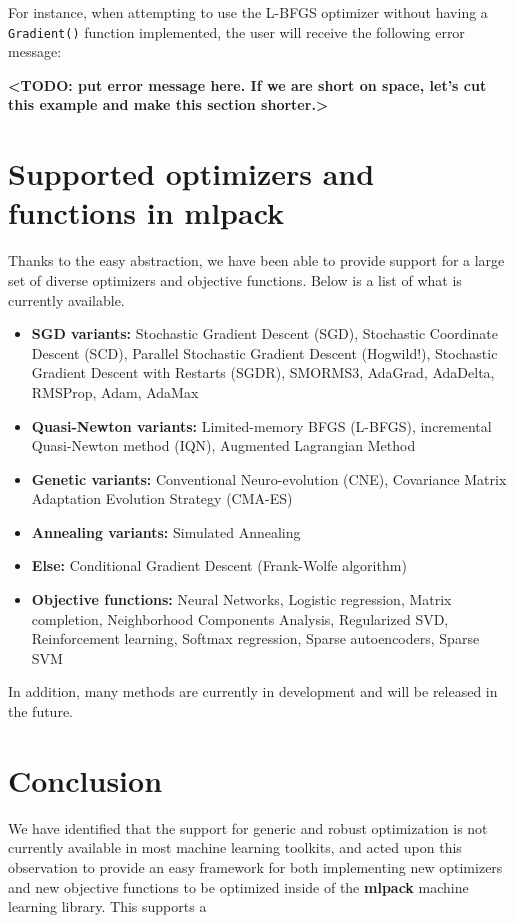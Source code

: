 \documentclass{article}
\begin{document}
For instance, when attempting to use the L-BFGS optimizer without having a
{\tt Gradient()} function implemented, the user will receive the following error
message:

{\bf <TODO: put error message here.  If we are short on space, let's cut this
example and make this section shorter.>}

\section{Supported optimizers and functions in mlpack}

Thanks to the easy abstraction, we have been able to provide support for a large
set of diverse optimizers and objective functions.  Below is a list of what is
currently available.

\begin{itemize}
  \item {\bf SGD variants:} Stochastic Gradient Descent (SGD), Stochastic
      Coordinate Descent (SCD), Parallel Stochastic Gradient Descent (Hogwild!),
      Stochastic Gradient Descent with Restarts (SGDR), SMORMS3, AdaGrad,
      AdaDelta, RMSProp, Adam, AdaMax

  \item {\bf Quasi-Newton variants:} Limited-memory BFGS (L-BFGS), incremental
        Quasi-Newton method (IQN), Augmented Lagrangian Method

  \item {\bf Genetic variants:} Conventional Neuro-evolution (CNE), Covariance
        Matrix Adaptation Evolution Strategy (CMA-ES)

  \item {\bf Annealing variants:} Simulated Annealing

  \item {\bf Else:} Conditional Gradient Descent (Frank-Wolfe algorithm)

  \item {\bf Objective functions:} Neural Networks, Logistic regression,
      Matrix completion, Neighborhood Components Analysis, Regularized SVD,
      Reinforcement learning, Softmax regression, Sparse autoencoders,
      Sparse SVM
\end{itemize}

In addition, many methods are currently in development and will be released in
the future.

\section{Conclusion}

We have identified that the support for generic and robust optimization is not
currently available in most machine learning toolkits, and acted upon this
observation to provide an easy framework for both implementing new optimizers
and new objective functions to be optimized inside of the {\bf mlpack} machine
learning library.  This supports a 



\end{document}
